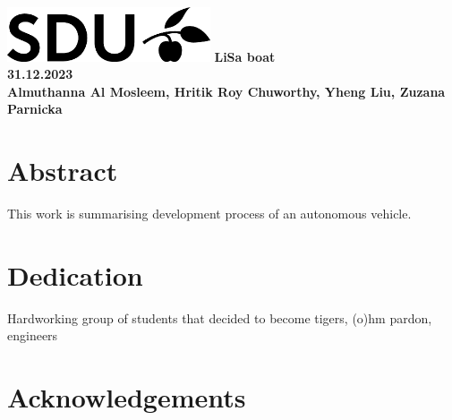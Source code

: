 \documentclass{report}
\begin{document}
\begin{titlepage}
    \centering
    \vfill
    \includegraphics[width=6cm]{SDU_logo}
    \vskip4cm
    {\bfseries\Large
        LiSa boat \\
        31.12.2023 \\
        \vskip2cm
        Almuthanna Al Mosleem, Hritik Roy Chuworthy, Yheng Liu, Zuzana Parnicka\\
    }    
    \vfill
    
\end{titlepage}

\chapter*{Abstract}
This work is summarising development process of an autonomous vehicle.

\chapter*{Dedication}
Hardworking group of students that decided to become tigers, (o)hm pardon, engineers

\chapter *{Acknowledgements}





\end{document}
